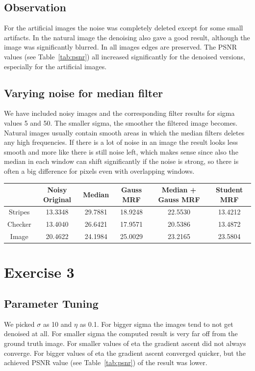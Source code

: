 \documentclass[a4paper,11pt, final]{scrartcl}
\begin{document}
\subsection*{Observation}
For the artificial images the noise was completely deleted except for some small artifacts. In the natural image the denoising also gave a good result, although the image was significantly blurred. In all images edges are preserved. The PSNR values (see Table~\ref{tab:psnr}) all increased significantly for the denoised versions, especially for the artificial images.

\subsection*{Varying noise for median filter}
We have included noisy images and the corresponding filter results for sigma values 5 and 50. The smaller sigma, the smoother the filtered image becomes. Natural images usually contain smooth areas in which the median filters deletes any high frequencies. If there is a lot of noise in an image the result looks less smooth and more like there is still noise left, which makes sense since also the median in each window can shift significantly if the noise is strong, so there is often a big difference for pixels even with overlapping windows.

\vspace{1cm}
{
\centering 
\begin{tabular}{|c|c|c|c|c|c|} \hline
  & Noisy Original & Median & Gauss MRF & Median + Gauss MRF & Student MRF \\ \hline
 Stripes & 13.3348 & 29.7881 & 18.9248 & 22.5530 & 13.4212 \\ \hline
 Checker & 13.4040 & 26.6421 & 17.9571 & 20.5386 & 13.4872 \\ \hline
 Image & 20.4622 & 24.1984 & 25.0029 & 23.2165 & 23.5804 \\ \hline
\end{tabular}
\label{tab:psnr}
}  

\section*{Exercise 3}

\subsection*{Parameter Tuning}
We picked $\sigma$ as 10 and $\eta$ as 0.1. For bigger sigma the images tend to not get denoised at all. For smaller sigma the computed result is very far off from the ground truth image. For smaller values of eta the gradient ascent did not always converge. For bigger values of eta the gradient ascent converged quicker, but the achieved PSNR value (see Table~\ref{tab:psnr}) of the result was lower.
\end{document}
